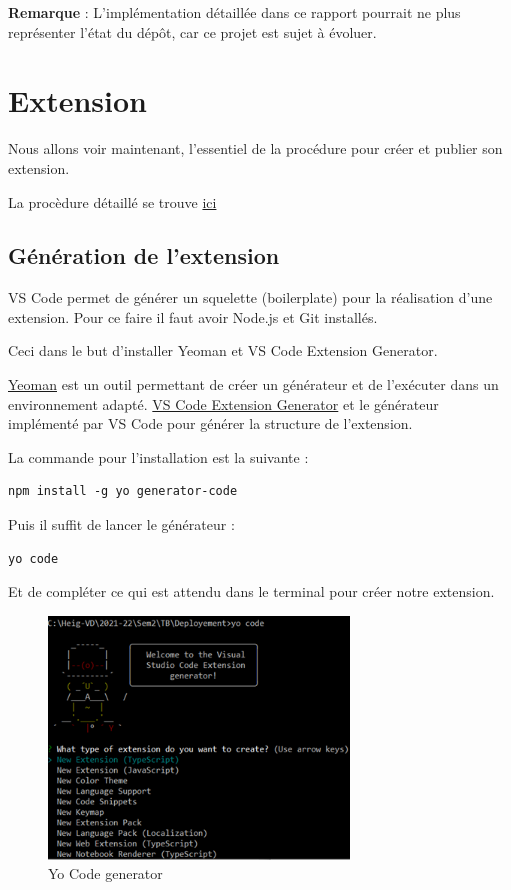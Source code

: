 \documentclass[
    iict, %
    il, %
]{heig-tb}
\begin{document}
\textbf{Remarque} : L'implémentation détaillée dans ce rapport pourrait ne plus représenter l'état du dépôt, car ce projet est sujet à évoluer.

\section{Extension}
Nous allons voir maintenant, l'essentiel de la procédure pour créer et publier son extension.

La procèdure détaillé se trouve \href{https://code.visualstudio.com/api/get-started/your-first-extension
}{ici}

\subsection{Génération de l'extension}

VS Code permet de générer un squelette (boilerplate) pour la réalisation d'une extension.
Pour ce faire il faut avoir Node.js et Git installés.

Ceci dans le but d'installer Yeoman et VS Code Extension Generator.

\href{https://yeoman.io/}{Yeoman} est un outil permettant de créer un générateur et de l'exécuter dans un environnement adapté.
\href{https://www.npmjs.com/package/generator-code}{VS Code Extension Generator} et le générateur implémenté par VS Code pour générer la structure de l'extension.

La commande pour l'installation est la suivante :

\begin{lstlisting}[frame=single,caption={generator-code},label={generator-code}]
npm install -g yo generator-code
\end{lstlisting}

Puis il suffit de lancer le générateur :

\begin{lstlisting}[frame=single]
yo code
\end{lstlisting}

Et de compléter ce qui est attendu dans le terminal pour créer notre extension.

\begin{figure}[!h]
    \begin{center}
        \includegraphics[width=8cm]{assets/figures/yo-code.png}
    \end{center}
    \caption[Yo Code generator]{\label{yo-code}Yo Code generator}
\end{figure}
\end{document}
